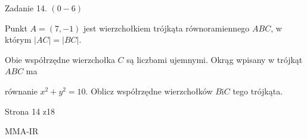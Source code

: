 \documentclass[a4paper,12pt]{article}
\begin{document}
Zadanie 14. $(0-6)$

Punkt $A=(7,-1)$ jest wierzchołkiem trójkąta równoramiennego $ABC$, w którym $|AC|=|BC|.$

Obie współrzędne wierzchołka $C$ są liczbami ujemnymi. Okrąg wpisany w trójkąt $ABC$ ma

równanie $x^{2}+y^{2}=10$. Oblicz współrzędne wierzchołków $B\mathrm{i}C$ tego trójkąta.

Strona 14 z18

MMA-IR
\end{document}
